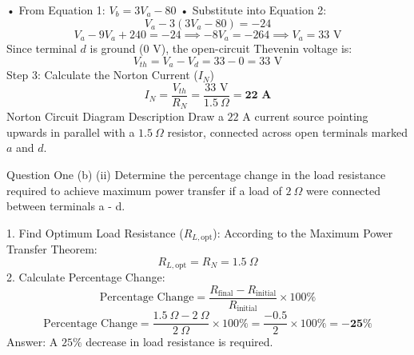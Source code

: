• From Equation 1: $V_b = 3V_a - 80$
• Substitute into Equation 2:
$$V_a - 3(3V_a - 80) = -24$$ 
$$V_a - 9V_a + 240 = -24 \implies -8V_a = -264 \implies V_a = 33\text{ V}$$ 
Since terminal $d$ is ground ($0\text{ V}$), the open-circuit Thevenin voltage is:
$$V_{th} = V_a - V_d = 33 - 0 = 33\text{ V}$$ 
Step 3: Calculate the Norton Current ($I_N$)
$$I_N = \frac{V_{th}}{R_N} = \frac{33\text{ V}}{1.5\ \Omega} = \mathbf{22\text{ A}}$$ 
Norton Circuit Diagram Description
Draw a $22\text{ A}$ current source pointing upwards in parallel with a $1.5\ \Omega$ resistor, connected across open terminals marked $a$ and $d$.

Question One (b) (ii)
Determine the percentage change in the load resistance required to achieve maximum power transfer if a load of $2\ \Omega$ were connected between terminals a - d.

1. Find Optimum Load Resistance ($R_{L,\text{opt}}$):
According to the Maximum Power Transfer Theorem:
$$R_{L,\text{opt}} = R_N = 1.5\ \Omega$$ 
2. Calculate Percentage Change:
$$\text{Percentage Change} = \frac{R_{\text{final}} - R_{\text{initial}}}{R_{\text{initial}}} \times 100\%$$ 
$$\text{Percentage Change} = \frac{1.5\ \Omega - 2\ \Omega}{2\ \Omega} \times 100\% = \frac{-0.5}{2} \times 100\% = \mathbf{-25\%}$$ 
Answer: A $25\%$ decrease in load resistance is required.
